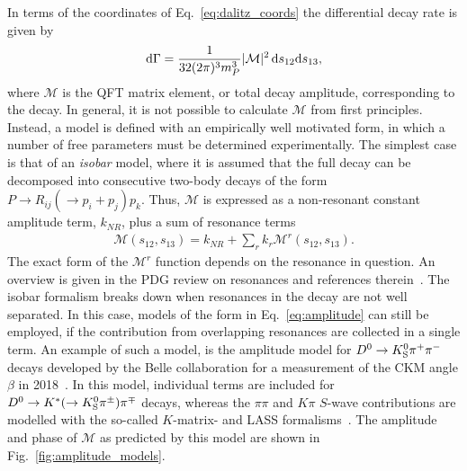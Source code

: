 In terms of the coordinates of Eq.~\eqref{eq:dalitz_coords} the differential decay rate is given by
\begin{align}
    \text d \Gamma = \frac{1}{32(2\pi)^3 m^3_P} |\mathcal M|^2 \,\text d s_{12} \text d s_{13},
\end{align}
where $\mathcal M$ is the QFT matrix element, or total decay amplitude, corresponding to the decay. In general, it is not possible to calculate $\mathcal M$ from first principles. Instead, a model is defined with an empirically well motivated form, in which a number of free parameters must be determined experimentally. The simplest case is that of an \emph{isobar} model, where it is assumed that the full decay can be decomposed into consecutive two-body decays of the form $P \to R_{ij} (\to p_i + p_j) p_k$. Thus, $\mathcal M$ is expressed as a non-resonant constant amplitude term, $k_{NR}$, plus a sum of resonance terms
\begin{align}\label{eq:amplitude}
    \mathcal M (s_{12}, s_{13}) = k_{NR} + \sum_r k_r \mathcal M^r(s_{12}, s_{13}).
\end{align}
The exact form of the $\mathcal M^r$ function depends on the resonance in question. An overview is given in the PDG review on resonances and references therein~\cite{PDG2020}. The isobar formalism breaks down when resonances in the decay are not well separated. In this case, models of the form in Eq.~\eqref{eq:amplitude} can still be employed, if the contribution from overlapping resonances are collected in a single term. An example of such a model, is the amplitude model for ${{D}^0}\rightarrow{\ensuremath{{K}^0_{\mathrm{S}}}}{\ensuremath{{\pi}^+}}{\ensuremath{{\pi}^-}}$ decays developed by the Belle collaboration for a measurement of the CKM angle $\beta$ in 2018~\cite{Belle2018}. In this model, individual terms are included for ${{D}^0}\rightarrow{\ensuremath{{K}^*}}(\rightarrow{\ensuremath{{K}^0_{\mathrm{S}}}}\pi^\pm){{\pi}^\mp}$ decays, whereas the $\pi\pi$ and $K\pi$  $S$-wave contributions are modelled with the so-called $K$-matrix- and LASS formalisms~\cite{chungPartialWaveAnalysis1995,astonStudyPiScattering1988}. The amplitude and phase of $\mathcal M$ as predicted by this model are shown in Fig.~\ref{fig:amplitude_models}.

